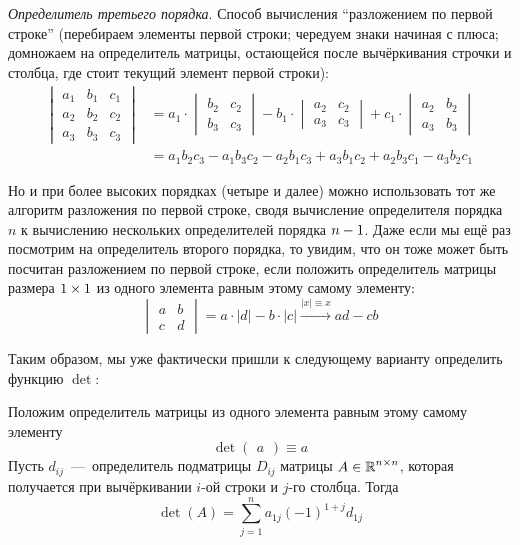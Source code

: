 \documentclass[a4paper,12pt]{article}
\begin{document}
  \emph{Определитель третьего порядка}.
  Способ вычисления ``разложением по первой строке'' (перебираем элементы первой строки; чередуем знаки начиная с плюса; домножаем на определитель матрицы, остающейся после вычёркивания строчки и столбца, где стоит текущий элемент первой строки):
  \begin{equation}
  \label{eq:third-order-det-fy-first-line}
  \begin{split}
    \begin{vmatrix}
      a_1 & b_1 & c_1\\
      a_2 & b_2 & c_2\\
      a_3 & b_3 & c_3
    \end{vmatrix} &=
      a_1 \cdot \begin{vmatrix}b_2 & c_2\\b_3 & c_3\end{vmatrix}
      - b_1 \cdot \begin{vmatrix}a_2 & c_2\\a_3 & c_3\end{vmatrix}
      + c_1 \cdot \begin{vmatrix}a_2 & b_2\\a_3 & b_3\end{vmatrix}\\
      &=a_1 b_2 c_3 - a_1 b_3 c_2 - a_2 b_1 c_3 + a_3 b_1 c_2 + a_2 b_3 c_1 - a_3 b_2 c_1
  \end{split}
  \end{equation}
  
  Но и при более высоких порядках (четыре и далее) можно использовать тот же алгоритм разложения по первой строке, сводя вычисление определителя порядка $n$ к вычислению нескольких определителей порядка $n \hm- 1$.
  Даже если мы ещё раз посмотрим на определитель второго порядка, то увидим, что он тоже может быть посчитан разложением по первой строке, если положить определитель матрицы размера $1 \hm\times 1$ из одного элемента равным этому самому элементу:
  \[
    \begin{vmatrix}
      a & b\\
      c & d
    \end{vmatrix}
    = a \cdot |d| - b \cdot |c|
    \xrightarrow{|x| \equiv x} ad - cb
  \]
  
  Таким образом, мы уже фактически пришли к следующему варианту определить функцию $\det$:
  
  \begin{definition}
    Положим определитель матрицы из одного элемента равным этому самому элементу
    \[
      \det \begin{pmatrix}a\end{pmatrix} \equiv a
    \]
    Пусть $d_{ij}$~---~определитель подматрицы $D_{ij}$ матрицы $A \in \operatorname{\mathbb R}^{n \times n}$, которая получается при вычёркивании $i$-ой строки и $j$-го столбца.
    Тогда
    \[
      \det(A) = \sum\limits_{j = 1}^n a_{1j} (-1)^{1 + j} d_{1j}
    \]
  \end{definition}
  
\end{document}
